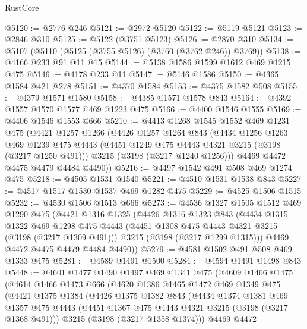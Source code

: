 \begin{lexlean}{RustCore}
\begin{coremodule}
@5120 := @2776 @246
@5121 := @2972 @5120
@5122 := @5119 @5121
@5123 := @2846 @310
@5125 := @5122 (@3751 @5123)
@5126 := @2870 @310
@5134 := @5107 (@5110 (@5125 (@3755 @5126) (@3760 (@3762 @246)) @3769))
@5138 := @4166 @233 @91 @11 @15
@5144 := @5138 @1586 @1599 @1612 @469 @1215 @475
@5146 := @4178 @233 @11
@5147 := @5146 @1586
@5150 := @4365 @1584 @421 @278
@5151 := @4370 @1584
@5153 := @4375 @1582 @508
@5155 := @4379 @1571 @1580
@5158 := @4385 @1571 @1578 @843
@5164 := @4392 @1557 @1570 @1577 @469 @1223 @475
@5166 := @4400 @1546 @1555
@5169 := @4406 @1546 @1553 @666
@5210 := @4413
    @1268
    @1545
    @1552
    @469
    @1231
    @475
    (@4421
      @1257
      @1266
      (@4426
        @1257
        @1264
        @843
        (@4434
          @1256
          @1263
          @469
          @1239
          @475
          @4443
          (@4451 @1249 @475 @4443 @4321 @3215 (@3198 (@3217 @1250 @491)))
          @3215
          (@3198 (@3217 @1240 @1256)))
        @4469
        @4472
        @4475
        @4479
        @4484
        @4490))
@5216 := @4497 @1542 @491 @508 @469 @1274 @475
@5218 := @4505 @1531 @1540
@5221 := @4510 @1531 @1538 @843
@5227 := @4517 @1517 @1530 @1537 @469 @1282 @475
@5229 := @4525 @1506 @1515
@5232 := @4530 @1506 @1513 @666
@5273 := @4536
    @1327
    @1505
    @1512
    @469
    @1290
    @475
    (@4421
      @1316
      @1325
      (@4426
        @1316
        @1323
        @843
        (@4434
          @1315
          @1322
          @469
          @1298
          @475
          @4443
          (@4451 @1308 @475 @4443 @4321 @3215 (@3198 (@3217 @1309 @491)))
          @3215
          (@3198 (@3217 @1299 @1315)))
        @4469
        @4472
        @4475
        @4479
        @4484
        @4490))
@5279 := @4581 @1502 @491 @508 @469 @1333 @475
@5281 := @4589 @1491 @1500
@5284 := @4594 @1491 @1498 @843
@5448 := @4601
    @1477
    @1490
    @1497
    @469
    @1341
    @475
    (@4609
      @1466
      @1475
      (@4614
        @1466
        @1473
        @666
        (@4620
          @1386
          @1465
          @1472
          @469
          @1349
          @475
          (@4421
            @1375
            @1384
            (@4426
              @1375
              @1382
              @843
              (@4434
                @1374
                @1381
                @469
                @1357
                @475
                @4443
                (@4451 @1367 @475 @4443 @4321 @3215 (@3198 (@3217 @1368 @491)))
                @3215
                (@3198 (@3217 @1358 @1374)))
              @4469
              @4472

\end{coremodule}
\end{lexlean}
